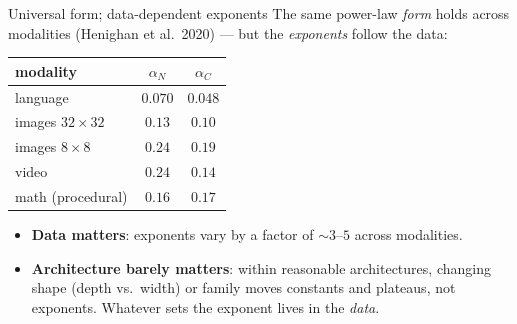 \documentclass[11pt]{beamer}
\newcommand{\hl}[1]{{\color{blue!60!black}\textbf{#1}}}
\begin{document}
\begin{frame}{Universal form; data-dependent exponents}
  The same power-law \emph{form} holds across modalities (Henighan et
  al.\ 2020) --- but the \emph{exponents} follow the data:
  \begin{center}\small
  \begin{tabular}{l|cc}
    modality & $\alpha_N$ & $\alpha_C$ \\\hline
    language & $0.070$ & $0.048$ \\
    images $32{\times}32$ & $0.13$ & $0.10$ \\
    images $8{\times}8$ & $0.24$ & $0.19$ \\
    video & $0.24$ & $0.14$ \\
    math (procedural) & $0.16$ & $0.17$
  \end{tabular} 
  \end{center}
  \vspace{1mm}
  \begin{itemize}
    \item \hl{Data matters}: exponents vary by a factor of
      $\sim\!3$--$5$ across modalities.   \pause
    \item \hl{Architecture barely matters}: within reasonable
      architectures, changing shape (depth vs.\ width) or family moves
      constants and plateaus, not exponents. Whatever sets the exponent
      lives in the \emph{data}.
  \end{itemize}
\end{frame}
\end{document}
